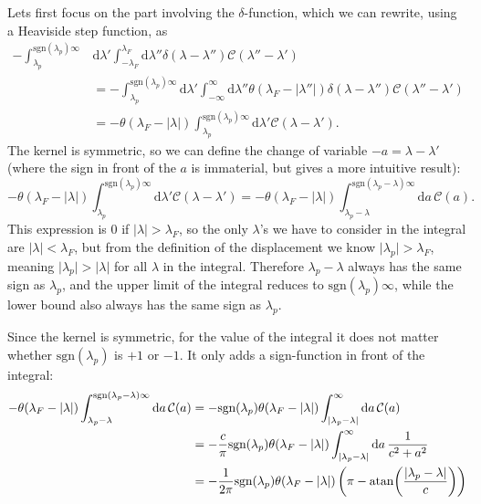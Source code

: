 \documentclass[11pt, a4paper]{report} %
\newcommand{\kernel}{\mathcal{C}}
\begin{document}
Lets first focus on the part involving the \(\delta\)-function, which we can rewrite, using a Heaviside step function, as
\begin{align}
	- \int_{\lambda_p}^{\textrm{sgn}(\lambda_p)\infty} &\mathrm{d}\lambda' \int_{-\lambda_F}^{\lambda_F} \textrm{d} \lambda'' \delta(\lambda-\lambda'') \kernel(\lambda''-\lambda') \\
	&=- \int_{\lambda_p}^{\textrm{sgn}(\lambda_p)\infty} \mathrm{d}\lambda' \int_{-\infty}^{\infty} \textrm{d} \lambda'' \theta(\lambda_F - \lvert \lambda'' \rvert)  \delta(\lambda-\lambda'') \kernel(\lambda''-\lambda')\\
	&= - \theta(\lambda_F - \lvert \lambda \rvert) \int_{\lambda_p}^{\textrm{sgn}(\lambda_p)\infty} \mathrm{d}\lambda'     \kernel(\lambda-\lambda').
\end{align}
The kernel is symmetric, so we can define the change of variable \(-a=\lambda-\lambda'\) (where the sign in front of the \(a\) is immaterial, but gives a more intuitive result):
\begin{equation}
	- \theta(\lambda_F - \lvert \lambda \rvert) \int_{\lambda_p}^{\textrm{sgn}(\lambda_p)\infty} \mathrm{d}\lambda'     \kernel(\lambda-\lambda')=
	- \theta(\lambda_F - \lvert \lambda \rvert) \int_{\lambda_p-\lambda}^{\textrm{sgn}(\lambda_p-\lambda)\infty} \mathrm{d}a\,\kernel(a).
\end{equation}
This expression is 0 if \(\lvert \lambda\rvert > \lambda_F\), so the only \(\lambda\)'s we have to consider in the integral are \(\lvert\lambda\rvert< \lambda_F\), but from the definition of the displacement we know \(\lvert\lambda_p\rvert >\lambda_F\), meaning \(\lvert\lambda_p\rvert > \lvert\lambda\rvert\) for all \(\lambda\) in the integral.
Therefore \(\lambda_p-\lambda\) always has the same sign as \(\lambda_p\), and the upper limit of the integral reduces to \(\mathrm{sgn}(\lambda_p)\infty\), while the lower bound also always has the same sign as \(\lambda_p\).

Since the kernel is symmetric, for the value of the integral it does not matter whether \(\mathrm{sgn}(\lambda_p)\) is \(+1\) or \(-1\). 
It only adds a sign-function in front of the integral:
\begin{align}
	-  \theta(\lambda_F - \lvert \lambda \rvert) \int_{\lambda_p-\lambda}^{\textrm{sgn}(\lambda_p-\lambda)\infty} \mathrm{d}a\,\kernel(a) &= - \textrm{sgn}(\lambda_p) \theta(\lambda_F - \lvert \lambda \rvert) \int_{\lvert\lambda_p-\lambda\rvert}^{\infty} \mathrm{d}a\,\kernel(a)\\
	&= - \frac{c}{\pi} \textrm{sgn}(\lambda_p) \theta(\lambda_F - \lvert \lambda \rvert)  \int_{\lvert\lambda_p-\lambda\rvert}^{\infty} \mathrm{d}a\,\frac{1}{c^2 + a^2}\\
	&= - \frac{1}{2\pi} \textrm{sgn}(\lambda_p) \theta(\lambda_F - \lvert \lambda \rvert)  \left( \pi - \atan(\frac{\lvert \lambda_p - \lambda\rvert}{c})\right)
\end{align}
\end{document}
